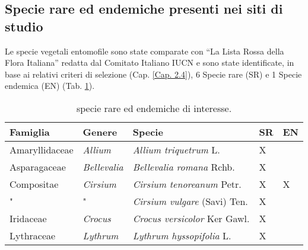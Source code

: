 \documentclass[main.tex]{subfiles}
\begin{document}
\subsection{Specie rare ed endemiche presenti nei siti di studio}

Le specie vegetali entomofile sono state comparate con “La Lista Rossa della Flora Italiana” redatta dal Comitato Italiano IUCN e sono state identificate, in base ai relativi criteri di selezione (Cap. \ref{Cap. 2.4}), 6 Specie rare (SR) e 1 Specie endemica (EN) (Tab. \ref{tab:6}).

\begin{table}[!ht]
    \centering
    \begin{tabular}{|l|l|l|l|l|}
    \hline
        \textbf{Famiglia} & \textbf{Genere} & \textbf{Specie} & \textbf{SR} & \textbf{EN} \\ \hline    
        Amaryllidaceae & \textit{Allium} & \textit{Allium triquetrum} L. & X & ~ \\ \hline
        Asparagaceae & \textit{Bellevalia} & \textit{Bellevalia romana} Rchb. & X & ~ \\ \hline
        Compositae & \textit{Cirsium} & \textit{Cirsium tenoreanum} Petr. & X & X \\ \hline
        " & " & \textit{Cirsium vulgare} (Savi) Ten. & X & ~ \\ \hline
        Iridaceae & \textit{Crocus} & \textit{Crocus versicolor} Ker Gawl. & X & ~ \\ \hline
        Lythraceae & \textit{Lythrum} & \textit{Lythrum hyssopifolia} L. & X & ~ \\ \hline
    \end{tabular}
        \caption{specie rare ed endemiche di interesse.}
    \label{tab:6}
\end{table}
\end{document}
